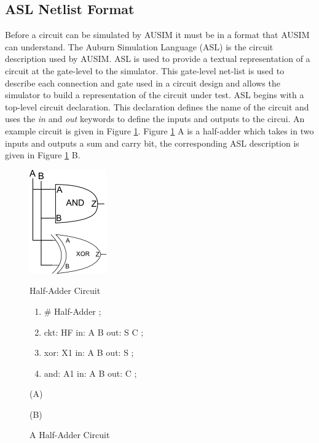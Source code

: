 \documentclass[12pt]{report}
\begin{document}
\subsection{ASL Netlist Format}
Before a circuit can be simulated by AUSIM it must be in a format that AUSIM can understand.  The Auburn Simulation Language (ASL) is the circuit description used by AUSIM\cite{asl}.  ASL is used to provide a textual representation of a circuit at the gate-level to the simulator.  This gate-level net-list is used to describe each connection and gate used in a circuit design and allows the simulator to build a representation of the circuit under test.  ASL begins with a top-level circuit declaration.  This declaration defines the name of the circuit and uses the \textit{in} and \textit{out} keywords to define the inputs and outputs to the circui\cite{asl}.  An example circuit is given in Figure \ref{fig:half_adder}.  Figure \ref{fig:half_adder} A is a half-adder which takes in two inputs and outputs a sum and carry bit, the corresponding ASL description is given in Figure \ref{fig:half_adder} B.
\begin{figure}
	\begin{center}
		\begin{minipage}[l]{.45\textwidth}
			\includegraphics[scale=1]{images/half-adder}	
		\end{minipage}
		\begin{minipage}[r]{.45\textwidth}
			\begin{center}
				Half-Adder Circuit
			\end{center}
			\begin{enumerate}
				\setlength{\itemsep}{0cm}
				\item \# Half-Adder ;
				\item ckt: HF in: A B out: S C ;
				\item xor: X1 in: A B out: S ;
				\item and: A1 in: A B out: C ;
			\end{enumerate}
		\end{minipage}
	\end{center}
	\begin{center}
		\begin{minipage}[l]{.45\textwidth}
			(A)
		\end{minipage}
		\begin{minipage}[r]{.45\textwidth}
			(B)
		\end{minipage}
	\end{center}
	\caption{A Half-Adder Circuit}
	\label{fig:half_adder}
\end{figure}
\end{document}
